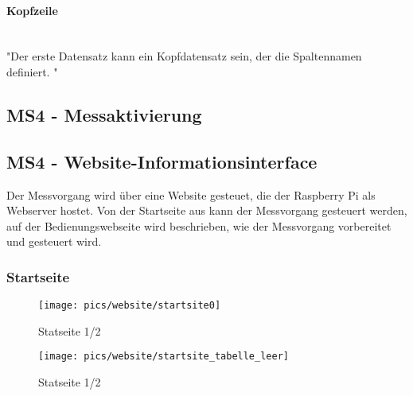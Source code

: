 \documentclass[12pt,a4paper]{article}
\begin{document}
\paragraph{Kopfzeile}\mbox{}\\
"Der erste Datensatz kann ein Kopfdatensatz sein, der die Spaltennamen definiert. "
%
%
\newpage
\subsection{MS4 - Messaktivierung}
\newpage
\subsection{MS4 - Website-Informationsinterface}
Der Messvorgang wird über eine Website gesteuet, die der Raspberry Pi als Webserver hostet. 
Von der Startseite aus kann der Messvorgang gesteuert werden, auf der Bedienungswebseite wird beschrieben, wie der 
Messvorgang vorbereitet und gesteuert wird. 
%
\subsubsection*{Startseite}
\begin{figure}[h!]
\centering
\texttt{[image: pics/website/startsite0]}
\caption{Statseite 1/2}
\end{figure}
%
%
\newpage
\begin{figure}[h!]
\centering
\texttt{[image: pics/website/startsite\_tabelle\_leer]}
\caption{Statseite 1/2}
\end{figure}
%
%
\newpage
\end{document}
